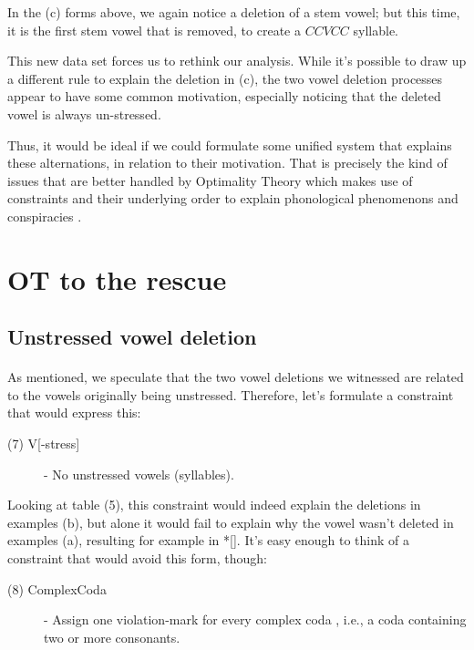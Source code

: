 \documentclass[12pt,draft]{article}
\begin{document}
In the (c) forms above, we again notice a deletion of a stem vowel; but this time, it is the first stem vowel that is removed, to create a $CCVCC$ syllable.

This new data set forces us to rethink our analysis.
While it's possible to draw up a different rule to explain the deletion in (c), the two vowel deletion processes appear to have some common motivation, especially noticing that the deleted vowel is always un-stressed.

Thus, it would be ideal if we could formulate some unified system that explains these alternations, in relation to their motivation.
That is precisely the kind of issues that are better handled by Optimality Theory \cite{kager1999optimality} which makes use of constraints and their underlying order to explain phonological phenomenons and conspiracies \cite{kisseberth1970functional}.

\section {OT to the rescue}

\subsection {Unstressed vowel deletion}

\paragraph*{}
As mentioned, we speculate that the two vowel deletions we witnessed are related to the vowels originally being unstressed.
Therefore, let's formulate a constraint that would express this:

\begin{description}
	\item[(7) {\sc *V[-stress]}] - No unstressed vowels (syllables).
\end{description}

Looking at table (5), this constraint would indeed explain the deletions in examples (b), but alone it would fail to explain why the vowel wasn't deleted in examples (a), resulting for example in *[].
It's easy enough to think of a constraint that would avoid this form, though:

\begin{description}
	\item[(8) {\sc *ComplexCoda}] - Assign one violation-mark for every complex coda \cite{princesmolensky:1993cca}, i.e., a coda containing two or more consonants.
\end{description}
\end{document}
